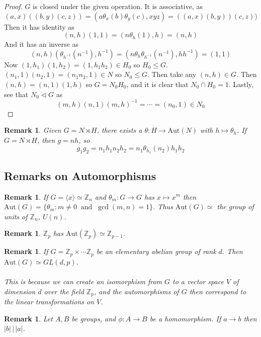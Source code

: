 \documentclass[a4paper,10pt]{article}
\newcommand{\ZZ}{\mathbb{Z}}
\newtheorem{rem}[thm]{Remark}
\begin{document}
\begin{proof}
$G$ is closed under the given operation. It is associative, as
\[ (a,x) ((b,y) (c,z)) = (a \theta_x (b) \theta_y (c), xyz) = ((a,x)(b,y))(c,z))\]
Then it has identity as
\[ (n,h) (1,1) = (n \theta_h(1), h) = (n,h) \]
And it has an inverse as
\[ (n,h)(\theta_{h^{-1}}(n^{-1}), h^{-1}) = (n \theta_h \theta_{h^{-1}} (n^{-1}), hh^{-1} ) = (1,1) \]
Now $(1,h_1) (1,h_2) = (1, h_1h_2) \in H_0$ so $H_0 \leq G$. $(n_1, 1)(n_2, 1) = (n_1n_2, 1) \in N$ so $N_0 \leq G$. Then take any $(n,h) \in G$. Then $(n,h) = (n,1)(1,h)$ so $G = N_0 H_0$, and it is clear that $N_0 \cap H_0 = 1$. Lastly, see that $N_0 \triangleleft G$ as
\[ (m,h) (n,1) (m,h)^{-1} = \cdots = (n_0, 1) \in N_0 \]

\end{proof}


\begin{rem}
Given $G = N \rtimes H$, there exists a $\theta : H \rightarrow \text{Aut}(N)$ with $h \mapsto \theta_h$. If $G = N \rtimes H$, then $g = nh$, so
\[ g_1 g_2 = n_1 h_1 n_2 h_2 = n_1 \theta_{h_1}(n_2) h_1 h_2 \]
\end{rem}

\subsection{Remarks on Automorphisms}

\begin{rem}
If $G = \langle x \rangle \simeq \ZZ_n$ and $\theta_m : G \rightarrow G$ has $x \mapsto x^m$ then $\text{Aut}(G)= \{ \theta_m : m \neq 0 \ \text{ and } \ \gcd(m,n) = 1 \}$. Thus $\text{Aut}(G) \simeq $ the group of units of $\ZZ_n$, $U(n)$. 
\end{rem}

\begin{rem}
$\ZZ_p$ has $\text{Aut}(\ZZ_p) \simeq \ZZ_{p-1}$. 
\end{rem}

\begin{rem}
If $G = \ZZ_p \times \cdots \ZZ_p$ be an elementary abelian group of rank $d$. Then $\text{Aut}(G) \simeq GL(d,p)$. \\
\\
This is because we can create an isomorphism from $G$ to a vector space $V$ of dimension $d$ over the field $\ZZ_p$, and the automorphisms of $G$ then correspond to the linear transformations on $V$. 
\end{rem}

\begin{rem}
Let $A,B$ be groups, and $\phi : A \rightarrow B$ be a homomorphism. If $a \rightarrow b$ then $|b| \, \big| \, |a|$.  
\end{rem}
\end{document}
